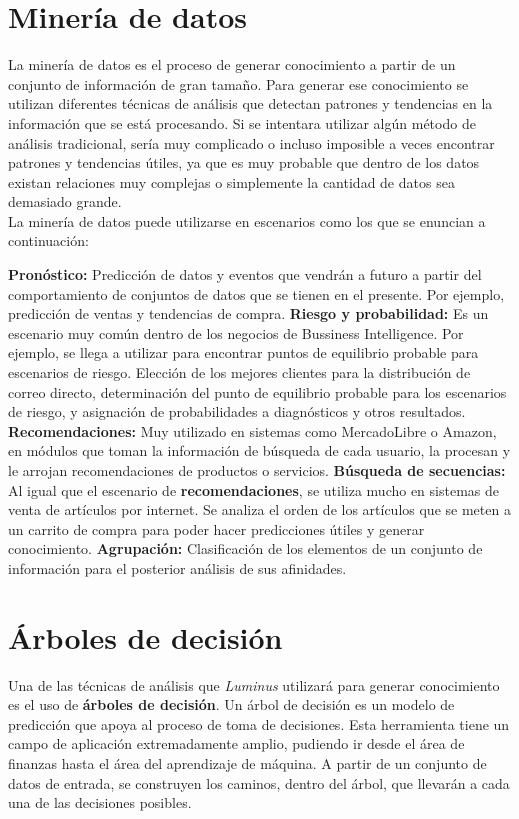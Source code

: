 \section{Minería de datos}
La minería de datos es el proceso de generar conocimiento a partir de un conjunto de información de gran tamaño. Para generar ese conocimiento se utilizan diferentes técnicas de análisis que detectan patrones y tendencias en la información que se está procesando. Si se intentara utilizar algún método de análisis tradicional, sería muy complicado o incluso imposible a veces encontrar patrones y tendencias útiles, ya que es muy probable que dentro de los datos existan relaciones muy complejas o simplemente la cantidad de datos sea demasiado grande.\cite{mineriaDef}\\

La minería de datos puede utilizarse en escenarios como los que se enuncian a continuación: \\
\begin{UClist}
	\UCli \textbf{Pronóstico:} Predicción de datos y eventos que vendrán a futuro a partir del comportamiento de conjuntos de datos que se tienen en el presente. Por ejemplo, predicción de ventas y tendencias de compra.\cite{mineriaEsc}
	\UCli \textbf{Riesgo y probabilidad:} Es un escenario muy común dentro de los negocios de Bussiness Intelligence. Por ejemplo, se llega a utilizar para encontrar puntos de equilibrio probable para escenarios de riesgo.
	Elección de los mejores clientes para la distribución de correo directo, determinación del punto de equilibrio probable para los escenarios de riesgo, y asignación de probabilidades a diagnósticos y otros resultados.\cite{mineriaEsc}
	\UCli \textbf{Recomendaciones:} Muy utilizado en sistemas como MercadoLibre o Amazon, en módulos que toman la información de búsqueda de cada usuario, la procesan y le arrojan recomendaciones de productos o servicios.\cite{mineriaEsc}
	\UCli \textbf{Búsqueda de secuencias:} Al igual que el escenario de \textbf{recomendaciones}, se utiliza mucho en sistemas de venta de artículos por internet. Se analiza el orden de los artículos que se meten a un carrito de compra para poder hacer predicciones útiles y generar conocimiento.\cite{mineriaEsc}
	\UCli \textbf{Agrupación:} Clasificación de los elementos de un conjunto de información para el posterior análisis de sus afinidades.\cite{mineriaEsc}
\end{UClist}

\section{Árboles de decisión}
Una de las técnicas de análisis que \emph{Luminus} utilizará para generar conocimiento es el uso de \textbf{árboles de decisión}. Un árbol de decisión es un modelo de predicción que apoya al proceso de toma de decisiones. Esta herramienta tiene un campo de aplicación extremadamente amplio, pudiendo ir desde el área de finanzas hasta el área del aprendizaje de máquina. A partir de un conjunto de datos de entrada, se construyen los caminos, dentro del árbol, que llevarán a cada una de las decisiones posibles.\cite{arbolesDes}\\

